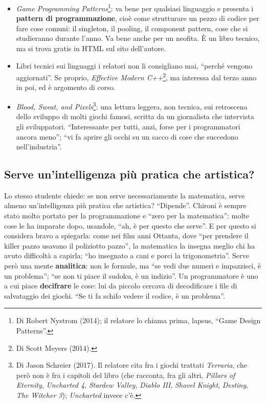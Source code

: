 \begin{itemize}
  \item \emph{Game Programming Patterns}\footnote{Di Robert Nystrom (2014); il
        relatore lo chiama prima, lapsus, ``Game Design Patterns''.}: va bene
        per qualsiasi linguaggio e presenta i \textbf{pattern di
        programmazione}, cioè come strutturare un pezzo di codice per fare cose
        comuni: il singleton, il pooling, il component pattern, cose che si
        studieranno durante l'anno. Va bene anche per un neofita. È un libro
        tecnico, ma si trova gratis in HTML sul sito dell'autore.
  \item Libri tecnici sui linguaggi i relatori non li consigliano mai,
        ``perché vengono aggiornati''. Se proprio, \emph{Effective Modern
        C++}\footnote{Di Scott Meyers (2014).}, ma interessa dal terzo anno in
        poi, ed è argomento di corso.
  \item \emph{Blood, Sweat, and Pixels}\footnote{Di Jason Schreier (2017). Il
        relatore cita fra i giochi trattati \emph{Terraria}, che però non è fra
        i capitoli del libro (che racconta, fra gli altri, \emph{Pillars of
        Eternity}, \emph{Uncharted 4}, \emph{Stardew Valley}, \emph{Diablo
        III}, \emph{Shovel Knight}, \emph{Destiny}, \emph{The Witcher 3});
        \emph{Uncharted} invece c'è.}: una lettura leggera, non tecnica, sui
        retroscena dello sviluppo di molti giochi famosi, scritta da un
        giornalista che intervista gli sviluppatori. ``Interessante per tutti,
        anzi, forse per i programmatori ancora meno''; ``vi fa aprire gli occhi
        su un sacco di cose che succedono nell'industria''.
\end{itemize}

\subsection{Serve un'intelligenza più pratica che artistica?}

Lo stesso studente chiede: se non serve necessariamente la matematica, serve
almeno un'intelligenza più pratica che artistica? ``Dipende''. Chironi è sempre
stato molto portato per la programmazione e ``zero per la matematica'': molte
cose le ha imparate dopo, usandole, ``ah, è per questo che serve''. E per
questo si considera bravo a spiegarla: come nei film anni Ottanta, dove ``per
prendere il killer pazzo usavano il poliziotto pazzo'', la matematica la
insegna meglio chi ha avuto difficoltà a capirla; ``ho insegnato a cani e porci
la trigonometria''. Serve però una mente \textbf{analitica}: non le formule, ma
``se vedi due numeri e impazzisci, è un problema''; ``se non ti piace il
sudoku, è un indizio''. Un programmatore è uno a cui piace \textbf{decifrare}
le cose: lui da piccolo cercava di decodificare i file di salvataggio dei
giochi. ``Se ti fa schifo vedere il codice, è un problema''.

